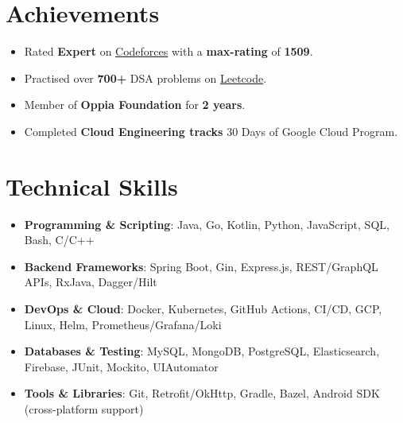 \documentclass[letterpaper,1pt]{article}
\begin{document}
% 

\section{Achievements}
\begin{itemize}[leftmargin=*, itemsep=1pt, parsep=0pt]
  \selectfont\small
  \setlength\itemsep{0em}
  \setlength\parsep{0em}
  \item Rated \textbf{Expert} on \href{https://codeforces.com/profile/GGodSSpeed}{Codeforces} with a \textbf{max-rating} of \textbf{1509}.
  \item Practised over \textbf{700+} DSA problems on \href{https://leetcode.com/u/nycstriker01/}{Leetcode}.
  \item Member of \textbf{Oppia Foundation} for \textbf{2 years}.
  \item Completed \textbf{Cloud Engineering tracks} 30 Days of Google Cloud Program.
\end{itemize}




%
\section{Technical Skills}
\begin{itemize}[leftmargin=*, itemsep=1pt, parsep=0pt]
  \selectfont\small
  \setlength\itemsep{0em}
  \setlength\parsep{0em}
  \item \textbf{Programming \& Scripting}: \hspace{0.2cm}
        Java, Go, Kotlin, Python, JavaScript, SQL, Bash, C/C++
  \item \textbf{Backend Frameworks}: \hspace{1.0cm}
        Spring Boot, Gin, Express.js, REST/GraphQL APIs, RxJava, Dagger/Hilt
  \item \textbf{DevOps \& Cloud}: \hspace{1.65cm}
        Docker, Kubernetes, GitHub Actions, CI/CD, GCP, Linux, Helm, Prometheus/Grafana/Loki
  \item \textbf{Databases \& Testing}: \hspace{1.0cm}
        MySQL, MongoDB, PostgreSQL, Elasticsearch, Firebase, JUnit, Mockito, UIAutomator
  \item \textbf{Tools \& Libraries}: \hspace{1.55cm}
        Git, Retrofit/OkHttp, Gradle, Bazel, Android SDK (cross-platform support)
\end{itemize}
\end{document}
